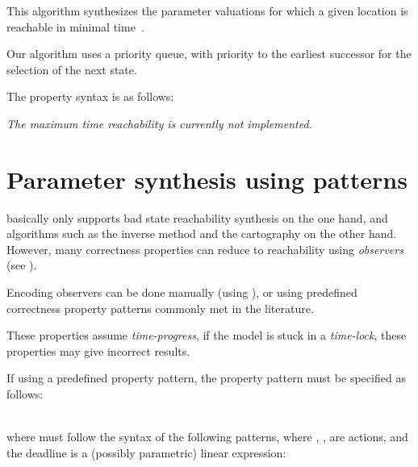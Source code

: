 This algorithm synthesizes the parameter valuations for which a given location is reachable in minimal time~\cite{ABPV19}.

Our algorithm uses a priority queue, with priority to the earliest successor for the selection of the next state.

%

The property syntax is as follows:


\emph{The maximum time reachability is currently not implemented.}


\section{Parameter synthesis using patterns}\label{ss:mode:prop}

\imitator{} basically only supports bad state reachability synthesis on the one hand, and algorithms such as the inverse method and the cartography on the other hand.
However, many correctness properties can reduce to reachability using \emph{observers} (see \cite{ABL98,ABBL98,ABBL03,Andre13ICECCS}).

Encoding observers can be done manually (using \adhoc{} \IPTA{}), or using predefined correctness property patterns commonly met in the literature.

\begin{becareful}
	These properties assume \emph{time-progress}, \ie{} if the model is stuck in a \emph{time-lock}, these properties may give incorrect results.
\end{becareful}


If using a predefined property pattern, the property pattern must be specified as follows:

\\
where  must follow the syntax of the following patterns, where , ,  are actions, and the deadline  is a (possibly parametric) linear expression:

